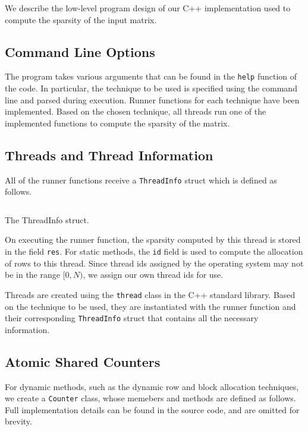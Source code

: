 \documentclass[conference,compsoc]{IEEEtran}
\begin{document}
We describe the low-level program design of our C++ implementation used to
compute the sparsity of the input matrix.

\subsection{Command Line Options}
\label{subsec:cmd-line-options}

The program takes various arguments that can be found in the \texttt{help}
function of the code. In particular, the technique to be used is specified using
the command line and parsed during execution. Runner functions for each
technique have been implemented. Based on the chosen technique, all threads run
one of the implemented functions to compute the sparsity of the matrix.

\subsection{Threads and Thread Information}
\label{subsec:threads}

All of the runner functions receive a \texttt{ThreadInfo} struct which is
defined as follows.

\begin{listing}[!ht]
\inputminted{cpp}{codes/ThreadInfo.cpp}
\caption{The ThreadInfo struct.}
\label{code:ThreadInfo}
\end{listing}

On executing the runner function, the sparsity computed by this thread is stored
in the field \texttt{res}. For static methods, the \texttt{id} field is used to
compute the allocation of rows to this thread. Since thread ids assigned by the
operating system may not be in the range \([0, N)\), we assign our own thread
ids for use.

Threads are created using the \texttt{thread} class in the C++ standard library.
Based on the technique to be used, they are instantiated with the runner
function and their corresponding \texttt{ThreadInfo} struct that contains all
the necessary information.

\subsection{Atomic Shared Counters}
\label{subsec:counter}

For dynamic methods, such as the dynamic row and block allocation techniques, we
create a \texttt{Counter} class, whose memebers and methods are defined as
follows. Full implementation details can be found in the source code, and are
omitted for brevity.
\end{document}
